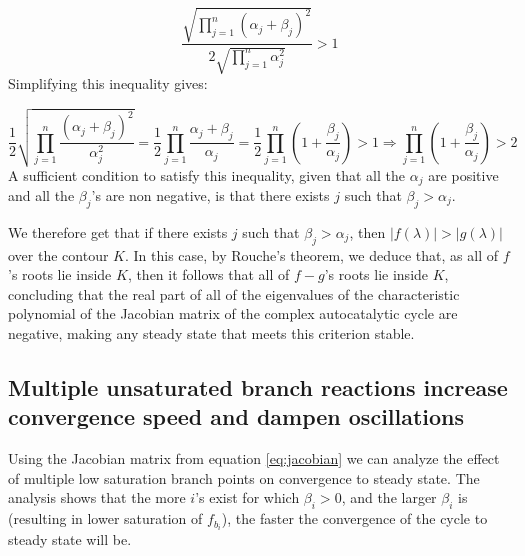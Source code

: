  \begin{equation*}
   \frac{\sqrt{\prod_{j=1}^n(\alpha_j+\beta_j)^2}}{2\sqrt{\prod_{j=1}^n\alpha_j^2}}>1
 \end{equation*}
 Simplifying this inequality gives:

 \begin{equation*}
     \frac{1}{2}\sqrt{\prod_{j=1}^n\frac{(\alpha_j+\beta_j)^2}{\alpha_j^2}}= \frac{1}{2}\prod_{j=1}^n\frac{\alpha_j+\beta_j}{\alpha_j}= \frac{1}{2}\prod_{j=1}^n(1+\frac{\beta_j}{\alpha_j})>1 \Rightarrow \prod_{j=1}^n(1+\frac{\beta_j}{\alpha_j})>2
 \end{equation*}
 A sufficient condition to satisfy this inequality, given that all the $\alpha_j$ are positive and all the $\beta_j$'s are non negative, is that there exists $j$ such that $\beta_j > \alpha_j$.

 We therefore get that if there exists $j$ such that  $\beta_j > \alpha_j$, then $|f(\lambda)|>|g(\lambda)|$ over the contour $K$.
 In this case, by Rouche's theorem, we deduce that, as all of $f$'s roots lie inside $K$, then it follows that all of $f-g$'s roots lie inside $K$, concluding that the real part of all of the eigenvalues of the characteristic polynomial of the Jacobian matrix of the complex autocatalytic cycle are negative, making any steady state that meets this criterion stable.

 \subsection{Multiple unsaturated branch reactions increase convergence speed and dampen oscillations}
 Using the Jacobian matrix from equation \ref{eq:jacobian} we can analyze the effect of multiple low saturation branch points on convergence to steady state.
 The analysis shows that the more $i$'s exist for which $\beta_i>0$, and the larger $\beta_i$ is (resulting in lower saturation of $f_{b_i}$), the faster the convergence of the cycle to steady state will be.

